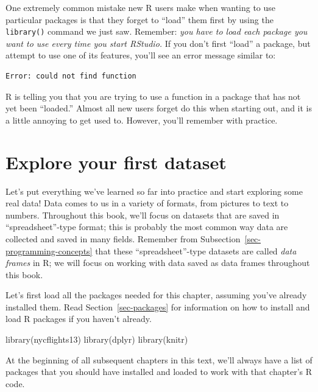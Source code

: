 \documentclass[
  letterpaper,
  DIV=11,
  numbers=noendperiod]{scrreprt}
\newenvironment{Shaded}{\begin{snugshade}}{\end{snugshade}}
\newcommand{\FunctionTok}[1]{\textcolor[rgb]{0.28,0.35,0.67}{#1}}
\newcommand{\NormalTok}[1]{\textcolor[rgb]{0.00,0.23,0.31}{#1}}
\theoremstyle{definition}
\theoremstyle{remark}
\begin{document}
One extremely common mistake new R users make when wanting to use
particular packages is that they forget to ``load'' them first by using
the \texttt{library()} command we just saw. Remember: \emph{you have to
load each package you want to use every time you start RStudio.} If you
don't first ``load'' a package, but attempt to use one of its features,
you'll see an error message similar to:

\begin{verbatim}
Error: could not find function
\end{verbatim}

R is telling you that you are trying to use a function in a package that
has not yet been ``loaded.'' Almost all new users forget do this when
starting out, and it is a little annoying to get used to. However,
you'll remember with practice.

\hypertarget{sec-nycflights13}{%
\section{Explore your first dataset}\label{sec-nycflights13}}

Let's put everything we've learned so far into practice and start
exploring some real data! Data comes to us in a variety of formats, from
pictures to text to numbers. Throughout this book, we'll focus on
datasets that are saved in ``spreadsheet''-type format; this is probably
the most common way data are collected and saved in many fields.
Remember from Subsection~\ref{sec-programming-concepts} that these
``spreadsheet''-type datasets are called \emph{data frames} in R; we
will focus on working with data saved as data frames throughout this
book.

Let's first load all the packages needed for this chapter, assuming
you've already installed them. Read Section~\ref{sec-packages} for
information on how to install and load R packages if you haven't
already.

\begin{Shaded}
\begin{Highlighting}[]
\FunctionTok{library}\NormalTok{(nycflights13)}
\FunctionTok{library}\NormalTok{(dplyr)}
\FunctionTok{library}\NormalTok{(knitr)}
\end{Highlighting}
\end{Shaded}

At the beginning of all subsequent chapters in this text, we'll always
have a list of packages that you should have installed and loaded to
work with that chapter's R code.
\end{document}
